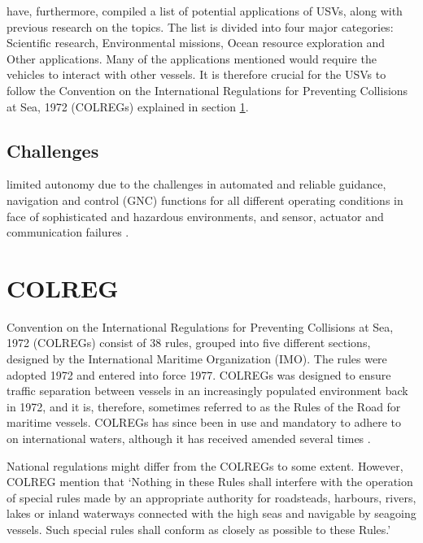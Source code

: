 \textcite{liu2016unmanned} have, furthermore, compiled a list of potential applications of USVs, along with previous research on the topics.
The list is divided into four major categories: Scientific research, Environmental missions, Ocean resource exploration and Other applications.
Many of the applications mentioned would require the vehicles to interact with other vessels.
It is therefore crucial for the USVs to follow the Convention on the International Regulations for Preventing Collisions at Sea, 1972 (COLREGs) explained in section \ref{sec_colreg}.


\subsection{Challenges}
limited autonomy due to the challenges in automated and reliable guidance, navigation and control (GNC) functions for all different operating conditions in face of sophisticated and hazardous environments, and sensor, actuator and communication failures \cite{liu2016unmanned}.
\section{COLREG}
\label{sec_colreg}
Convention on the International Regulations for Preventing Collisions at Sea, 1972 (COLREGs) consist of 38 rules, grouped into five different sections, designed by the International Maritime Organization (IMO).
The rules were adopted 1972 and entered into force 1977.
COLREGs was designed to ensure traffic separation between vessels in an increasingly populated environment back in 1972, and it is, therefore, sometimes referred to as the Rules of the Road for maritime vessels.
COLREGs has since been in use and mandatory to adhere to on international waters, although it has received amended several times \cite{colreg_about_imo}.

National regulations might differ from the COLREGs to some extent. However, COLREG mention that ‘Nothing in these Rules shall interfere with the operation of special rules made by an appropriate authority for
roadsteads, harbours, rivers, lakes or inland waterways connected with the high seas and navigable by seagoing
vessels.
Such special rules shall conform as closely as possible to these Rules.’ \cite{colreg}

